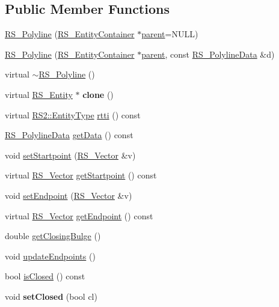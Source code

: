 \subsection*{Public Member Functions}
\begin{DoxyCompactItemize}
\item 
\hyperlink{classRS__Polyline_ab62d5bde3f9d0dbb6ae363e647a2cf2b}{R\-S\-\_\-\-Polyline} (\hyperlink{classRS__EntityContainer}{R\-S\-\_\-\-Entity\-Container} $\ast$\hyperlink{classRS__Entity_a80358a8d2fc6739a516a278dc500b49f}{parent}=N\-U\-L\-L)
\item 
\hyperlink{classRS__Polyline_a7b72a083c1917e44b9accf7986b74f3e}{R\-S\-\_\-\-Polyline} (\hyperlink{classRS__EntityContainer}{R\-S\-\_\-\-Entity\-Container} $\ast$\hyperlink{classRS__Entity_a80358a8d2fc6739a516a278dc500b49f}{parent}, const \hyperlink{classRS__PolylineData}{R\-S\-\_\-\-Polyline\-Data} \&d)
\item 
virtual \hyperlink{classRS__Polyline_ad1c349bae419449d2f17e2e55e045917}{$\sim$\-R\-S\-\_\-\-Polyline} ()
\item 
\hypertarget{classRS__Polyline_a83ec01c4066444c51c3a8293cd4a4707}{virtual \hyperlink{classRS__Entity}{R\-S\-\_\-\-Entity} $\ast$ {\bfseries clone} ()}\label{classRS__Polyline_a83ec01c4066444c51c3a8293cd4a4707}

\item 
virtual \hyperlink{classRS2_a8f26d1b981e1e85cff16738b43337e6a}{R\-S2\-::\-Entity\-Type} \hyperlink{classRS__Polyline_a2e8db79331e3e905cf52c2d70dac5fa7}{rtti} () const 
\item 
\hyperlink{classRS__PolylineData}{R\-S\-\_\-\-Polyline\-Data} \hyperlink{classRS__Polyline_a774633858831debd23b26883926112d0}{get\-Data} () const 
\item 
void \hyperlink{classRS__Polyline_a6212dedbf68e5ff76774ad5a61114dc2}{set\-Startpoint} (\hyperlink{classRS__Vector}{R\-S\-\_\-\-Vector} \&v)
\item 
virtual \hyperlink{classRS__Vector}{R\-S\-\_\-\-Vector} \hyperlink{classRS__Polyline_ac5a329a0fd3268ed0259cce4f78e3fa1}{get\-Startpoint} () const 
\item 
void \hyperlink{classRS__Polyline_ad5b7b3eeb8f48973baa0a847ba0febd1}{set\-Endpoint} (\hyperlink{classRS__Vector}{R\-S\-\_\-\-Vector} \&v)
\item 
virtual \hyperlink{classRS__Vector}{R\-S\-\_\-\-Vector} \hyperlink{classRS__Polyline_a6b7f9a2388e70470a1fd33de4b41f520}{get\-Endpoint} () const 
\item 
double \hyperlink{classRS__Polyline_a37eff00c7994d67b766a1c614cc158af}{get\-Closing\-Bulge} ()
\item 
void \hyperlink{classRS__Polyline_a8e2f82c5b95a0ce341cd89c5444ca635}{update\-Endpoints} ()
\item 
bool \hyperlink{classRS__Polyline_a01e36ee27f1c84625d1174aff7194689}{is\-Closed} () const 
\item 
\hypertarget{classRS__Polyline_a1ae0e74e81953ed2b219b80e11efa4fc}{void {\bfseries set\-Closed} (bool cl)}\label{classRS__Polyline_a1ae0e74e81953ed2b219b80e11efa4fc}


\end{DoxyCompactItemize}
